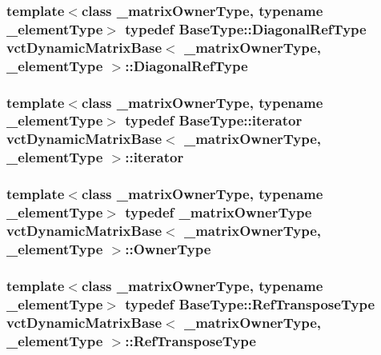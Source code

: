 \hypertarget{classvct_dynamic_matrix_base_a594a79de6406a638f5e725daa76294a6}{
\subsubsection[{Diagonal\-Ref\-Type}]{\setlength{\rightskip}{0pt plus 5cm}template$<$class \-\_\-matrix\-Owner\-Type, typename \-\_\-element\-Type$>$ typedef {\bf Base\-Type\-::\-Diagonal\-Ref\-Type} {\bf vct\-Dynamic\-Matrix\-Base}$<$ \-\_\-matrix\-Owner\-Type, \-\_\-element\-Type $>$\-::{\bf Diagonal\-Ref\-Type}}}\label{classvct_dynamic_matrix_base_a594a79de6406a638f5e725daa76294a6}
\hypertarget{classvct_dynamic_matrix_base_a60f380ccdba201f2cec57ec3905b8229}{
\subsubsection[{iterator}]{\setlength{\rightskip}{0pt plus 5cm}template$<$class \-\_\-matrix\-Owner\-Type, typename \-\_\-element\-Type$>$ typedef {\bf Base\-Type\-::iterator} {\bf vct\-Dynamic\-Matrix\-Base}$<$ \-\_\-matrix\-Owner\-Type, \-\_\-element\-Type $>$\-::{\bf iterator}}}\label{classvct_dynamic_matrix_base_a60f380ccdba201f2cec57ec3905b8229}
\hypertarget{classvct_dynamic_matrix_base_a224b1f3a25e201d7b45be1da3ac69951}{
\subsubsection[{Owner\-Type}]{\setlength{\rightskip}{0pt plus 5cm}template$<$class \-\_\-matrix\-Owner\-Type, typename \-\_\-element\-Type$>$ typedef \-\_\-matrix\-Owner\-Type {\bf vct\-Dynamic\-Matrix\-Base}$<$ \-\_\-matrix\-Owner\-Type, \-\_\-element\-Type $>$\-::{\bf Owner\-Type}}}\label{classvct_dynamic_matrix_base_a224b1f3a25e201d7b45be1da3ac69951}
\hypertarget{classvct_dynamic_matrix_base_a21a1c69f7e029b28a2884718ac9c297b}{
\subsubsection[{Ref\-Transpose\-Type}]{\setlength{\rightskip}{0pt plus 5cm}template$<$class \-\_\-matrix\-Owner\-Type, typename \-\_\-element\-Type$>$ typedef {\bf Base\-Type\-::\-Ref\-Transpose\-Type} {\bf vct\-Dynamic\-Matrix\-Base}$<$ \-\_\-matrix\-Owner\-Type, \-\_\-element\-Type $>$\-::{\bf Ref\-Transpose\-Type}}}\label{classvct_dynamic_matrix_base_a21a1c69f7e029b28a2884718ac9c297b}
